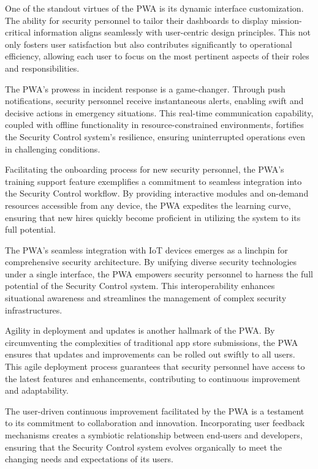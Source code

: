 \documentclass[journal]{IEEEtran}
\begin{document}
	One of the standout virtues of the PWA is its dynamic interface customization. The ability for security personnel to tailor their dashboards to display mission-critical information aligns seamlessly with user-centric design principles. This not only fosters user satisfaction but also contributes significantly to operational efficiency, allowing each user to focus on the most pertinent aspects of their roles and responsibilities.
	
	The PWA's prowess in incident response is a game-changer. Through push notifications, security personnel receive instantaneous alerts, enabling swift and decisive actions in emergency situations. This real-time communication capability, coupled with offline functionality in resource-constrained environments, fortifies the Security Control system's resilience, ensuring uninterrupted operations even in challenging conditions.
	
	Facilitating the onboarding process for new security personnel, the PWA's training support feature exemplifies a commitment to seamless integration into the Security Control workflow. By providing interactive modules and on-demand resources accessible from any device, the PWA expedites the learning curve, ensuring that new hires quickly become proficient in utilizing the system to its full potential.
	
	The PWA's seamless integration with IoT devices emerges as a linchpin for comprehensive security architecture. By unifying diverse security technologies under a single interface, the PWA empowers security personnel to harness the full potential of the Security Control system. This interoperability enhances situational awareness and streamlines the management of complex security infrastructures.
	
	Agility in deployment and updates is another hallmark of the PWA. By circumventing the complexities of traditional app store submissions, the PWA ensures that updates and improvements can be rolled out swiftly to all users. This agile deployment process guarantees that security personnel have access to the latest features and enhancements, contributing to continuous improvement and adaptability.
	
	The user-driven continuous improvement facilitated by the PWA is a testament to its commitment to collaboration and innovation. Incorporating user feedback mechanisms creates a symbiotic relationship between end-users and developers, ensuring that the Security Control system evolves organically to meet the changing needs and expectations of its users.
	
\end{document}
